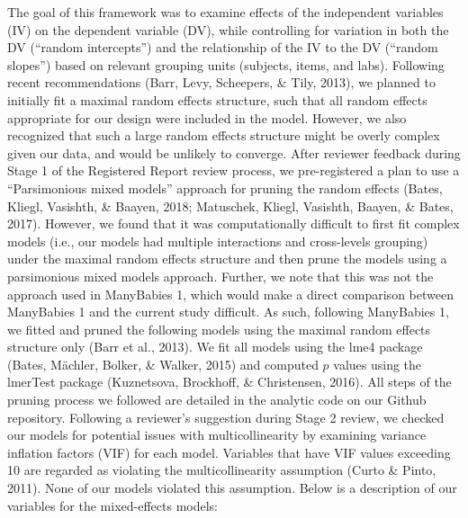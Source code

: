 \documentclass[
  english,
  ,man,floatsintext]{apa6}
\begin{document}
The goal of this framework was to examine effects of the independent variables (IV) on the dependent variable (DV), while controlling for variation in both the DV (\enquote{random intercepts}) and the relationship of the IV to the DV (\enquote{random slopes}) based on relevant grouping units (subjects, items, and labs). Following recent recommendations (Barr, Levy, Scheepers, \& Tily, 2013), we planned to initially fit a maximal random effects structure, such that all random effects appropriate for our design were included in the model. However, we also recognized that such a large random effects structure might be overly complex given our data, and would be unlikely to converge. After reviewer feedback during Stage 1 of the Registered Report review process, we pre-registered a plan to use a \enquote{Parsimonious mixed models} approach for pruning the random effects (Bates, Kliegl, Vasishth, \& Baayen, 2018; Matuschek, Kliegl, Vasishth, Baayen, \& Bates, 2017). However, we found that it was computationally difficult to first fit complex models (i.e., our models had multiple interactions and cross-levels grouping) under the maximal random effects structure and then prune the models using a parsimonious mixed models approach. Further, we note that this was not the approach used in ManyBabies 1, which would make a direct comparison between ManyBabies 1 and the current study difficult. As such, following ManyBabies 1, we fitted and pruned the following models using the maximal random effects structure only (Barr et al., 2013). We fit all models using the lme4 package (Bates, Mächler, Bolker, \& Walker, 2015) and computed \(p\) values using the lmerTest package (Kuznetsova, Brockhoff, \& Christensen, 2016). All steps of the pruning process we followed are detailed in the analytic code on our Github repository. Following a reviewer's suggestion during Stage 2 review, we checked our models for potential issues with multicollinearity by examining variance inflation factors (VIF) for each model. Variables that have VIF values exceeding 10 are regarded as violating the multicollinearity assumption (Curto \& Pinto, 2011). None of our models violated this assumption. Below is a description of our variables for the mixed-effects models:
\end{document}
